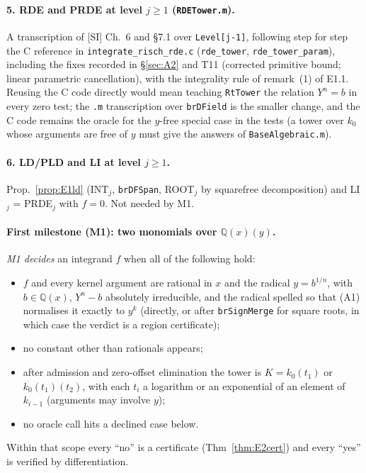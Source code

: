 \documentclass[11pt]{article}
\theoremstyle{definition}
\theoremstyle{remark}
\newcommand{\Q}{\mathbb{Q}}
\newcommand{\code}[1]{\texttt{#1}}
\begin{document}
\paragraph{5. RDE and PRDE at level $j\ge1$ (\code{RDETower.m}).} A transcription of [SI]
Ch.~6 and \S7.1 over \code{Level[j-1]}, following step for step the C reference in
\code{integrate\_risch\_rde.c} (\code{rde\_tower}, \code{rde\_tower\_param}), including the fixes
recorded in \S\ref{sec:A2} and T11 (corrected primitive bound; linear parametric cancellation),
with the integrality rule of remark~(1) of E1.1. Reusing the C code directly would mean teaching
\code{RtTower} the relation $Y^n=b$ in every zero test; the \code{.m} transcription over
\code{brDField} is the smaller change, and the C code remains the oracle for the $y$-free
special case in the tests (a tower over $k_0$ whose arguments are free of $y$ must give the
answers of \code{BaseAlgebraic.m}).

\paragraph{6. LD/PLD and LI at level $j\ge1$.} Prop.~\ref{prop:E1ld} (INT$_j$, \code{brDFSpan},
ROOT$_j$ by squarefree decomposition) and LI$_j$ = PRDE$_j$ with $f=0$. Not needed by M1.

\paragraph{First milestone (M1): two monomials over $\Q(x)(y)$.}
\emph{M1 decides} an integrand $f$ when all of the following hold:
\begin{itemize}
\item $f$ and every kernel argument are rational in $x$ and the radical $y=b^{1/n}$, with
  $b\in\Q(x)$, $Y^n-b$ absolutely irreducible, and the radical spelled so that (A1) normalises
  it exactly to $y^k$ (directly, or after \code{brSignMerge} for square roots, in which case the
  verdict is a region certificate);
\item no constant other than rationals appears;
\item after admission and zero-offset elimination the tower is $K=k_0(t_1)$ or
  $k_0(t_1)(t_2)$, with each $t_i$ a logarithm or an exponential of an element of $k_{i-1}$
  (arguments may involve $y$);
\item no oracle call hits a declined case below.
\end{itemize}
Within that scope every ``no'' is a certificate (Thm~\ref{thm:E2cert}) and every ``yes'' is
verified by differentiation.
\end{document}

